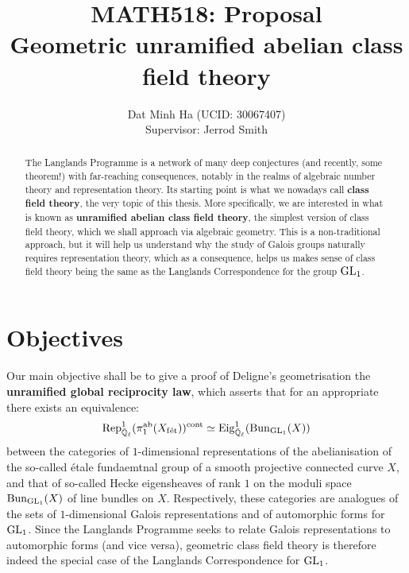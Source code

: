 
\usepackage{soul}





	\title{\textbf{MATH518: Proposal
	\\
	Geometric unramified abelian class field theory}}
	
	\author{Dat Minh Ha (UCID: 30067407)\\Supervisor: Jerrod Smith}
	\maketitle
	
	\begin{abstract}
	    The Langlands Programme is a network of many deep conjectures (and recently, some theorem!) with far-reaching consequences, notably in the realms of algebraic number theory and representation theory. Its starting point is what we nowadays call \textbf{class field theory}, the very topic of this thesis. More specifically, we are interested in what is known as \textbf{unramified abelian class field theory}, the simplest version of class field theory, which we shall approach via algebraic geometry. This is a non-traditional approach, but it will help us understand why the study of Galois groups naturally requires representation theory, which as a consequence, helps us makes sense of class field theory being the same as the Langlands Correspondence for the group $\operatorname{GL}_1$.
	\end{abstract}
	    
	\section{Objectives}
	    Our main objective shall be to give a proof of Deligne's geometrisation the \textbf{unramified global reciprocity law}, which asserts that for an appropriate there exists an equivalence:
	        $$\mathrm{Rep}_{\bar{\mathbb{Q}}_{\ell}}^1(\pi_1^{\mathrm{ab}}(X_{\mathrm{f\acute{e}t}}))^{\mathrm{cont}} \simeq \mathrm{Eig}^1_{\bar{\mathbb{Q}}_{\ell}}(\mathrm{Bun}_{\operatorname{GL}_1}(X))$$
	    between the categories of $1$-dimensional representations of the abelianisation of the so-called \'etale fundaemtnal group of a smooth projective connected curve $X$, and that of so-called Hecke eigensheaves of rank $1$ on the moduli space $\mathrm{Bun}_{\operatorname{GL}_1}(X)$ of line bundles on $X$. Respectively, these categories are analogues of the sets of $1$-dimensional Galois representations and of automorphic forms for $\operatorname{GL}_1$. Since the Langlands Programme seeks to relate Galois representations to automorphic forms (and vice versa), geometric class field theory is therefore indeed the special case of the Langlands Correspondence for $\operatorname{GL}_1$.
	
